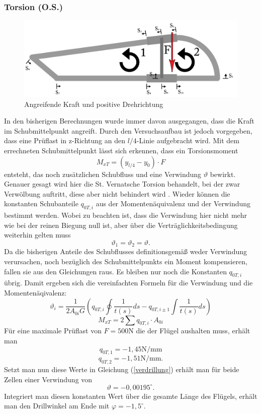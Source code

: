 \subsubsection{Torsion (O.S.)}
\begin{figure}[h]
	\centering
	\includegraphics[width=1\textwidth]{Bilder/Torsion}
	\caption{Angreifende Kraft und positive Drehrichtung}
\end{figure}
In den bisherigen Berechnungen wurde immer davon ausgegangen, dass die Kraft im Schubmittelpunkt angreift. Durch den Versuchsaufbau ist jedoch vorgegeben, dass eine Prüflast in z-Richtung an den $l/4$-Linie aufgebracht wird. Mit dem errechneten Schubmittelpunkt lässt sich erkennen, dass ein Torsionsmoment 
\begin{equation}
	M_{xT}=(y_{l/4}-y_{0})\cdot F
\end{equation}
entsteht, das noch zusätzlichen Schubfluss und eine Verwindung $\vartheta$ bewirkt. Genauer gesagt wird hier die St. Vernatsche Torsion behandelt, bei der zwar Verwölbung auftritt, diese aber nicht behindert wird \cite{item15}. Wieder können die konstanten Schubanteile $q_{0T,i}$ aus der Momentenäquivalenz und der Verwindung bestimmt werden. Wobei zu beachten ist, dass die Verwindung hier nicht mehr wie bei der reinen Biegung null ist, aber über die Verträglichkeitsbedingung weiterhin gelten muss
\begin{equation}
	\vartheta_{1}=\vartheta_{2}=\vartheta.
\end{equation}
Da die bisherigen Anteile des Schubflusses definitionsgemäß weder Verwindung verursachen, noch bezüglich des Schubmittelpunkts ein Moment kompensieren, fallen sie aus den Gleichungen raus. Es bleiben nur noch die Konstanten $q_{0T,i}$ übrig. Damit ergeben sich die vereinfachten Formeln für die Verwindung und die Momentenäqivalenz:
\begin{equation}\label{verdrillung}
	\vartheta_{i} = \frac{1}{2A_{0i}G}(q_{0T,i}\oint\frac{1}{t(s)}ds-q_{0T,i\pm1}\int\frac{1}{t(s)}ds)
\end{equation}
\begin{equation}
		M_{xT}=2\sum q_{0T,i}\cdot A_{0i}
\end{equation}
Für eine maximale Prüflast von $F=500\mathrm{N}$ die der Flügel aushalten muss, erhält man
$$
	q_{0T,1}=-1,45\mathrm{N/mm}
$$
$$
	q_{0T,2}=-1,51\mathrm{N/mm}.
$$
Setzt man nun diese Werte in Gleichung (\ref{verdrillung}) erhält man für beide Zellen einer Verwindung von
$$
	\vartheta =-0,00195 ^\circ.
$$
Integriert man diesen konstanten Wert über die gesamte Länge des Flügels, erhält man den Drillwinkel am Ende mit $\varphi = -1,5^\circ$.


